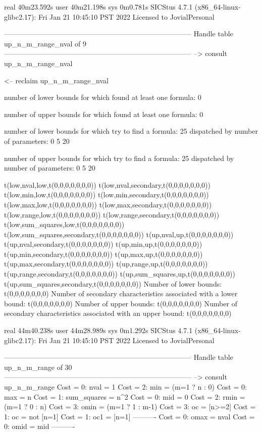 real	40m23.592s
user	40m21.198s
sys	0m0.781s
SICStus 4.7.1 (x86_64-linux-glibc2.17): Fri Jan 21 10:45:10 PST 2022
Licensed to JovialPersonal


--------------------------------------------------------------------------------
Handle table up_n_m_range_nval of 9
--------------------------------------------------------------------------------
--> consult up_n_m_range_nval

<-- reclaim up_n_m_range_nval

number of lower bounds for which found at least one formula: 0

number of upper bounds for which found at least one formula: 0

number of lower bounds for which try to find a formula: 25
dispatched by number of parameters: 0  5  20

number of upper bounds for which try to find a formula: 25
dispatched by number of parameters: 0  5  20

t(low,nval,low,t(0,0,0,0,0,0,0))
t(low,nval,secondary,t(0,0,0,0,0,0,0))
t(low,min,low,t(0,0,0,0,0,0,0))
t(low,min,secondary,t(0,0,0,0,0,0,0))
t(low,max,low,t(0,0,0,0,0,0,0))
t(low,max,secondary,t(0,0,0,0,0,0,0))
t(low,range,low,t(0,0,0,0,0,0,0))
t(low,range,secondary,t(0,0,0,0,0,0,0))
t(low,sum_squares,low,t(0,0,0,0,0,0,0))
t(low,sum_squares,secondary,t(0,0,0,0,0,0,0))
t(up,nval,up,t(0,0,0,0,0,0,0))
t(up,nval,secondary,t(0,0,0,0,0,0,0))
t(up,min,up,t(0,0,0,0,0,0,0))
t(up,min,secondary,t(0,0,0,0,0,0,0))
t(up,max,up,t(0,0,0,0,0,0,0))
t(up,max,secondary,t(0,0,0,0,0,0,0))
t(up,range,up,t(0,0,0,0,0,0,0))
t(up,range,secondary,t(0,0,0,0,0,0,0))
t(up,sum_squares,up,t(0,0,0,0,0,0,0))
t(up,sum_squares,secondary,t(0,0,0,0,0,0,0))
Number of lower bounds:                                             t(0,0,0,0,0,0,0)
Number of secondary characteristics associated with a lower bound:  t(0,0,0,0,0,0,0)
Number of upper bounds:                                             t(0,0,0,0,0,0,0)
Number of secondary characteristics associated with an upper bound: t(0,0,0,0,0,0,0)

real	44m40.238s
user	44m28.989s
sys	0m1.292s
SICStus 4.7.1 (x86_64-linux-glibc2.17): Fri Jan 21 10:45:10 PST 2022
Licensed to JovialPersonal


--------------------------------------------------------------------------------
Handle table up_n_m_range of 30
--------------------------------------------------------------------------------
--> consult up_n_m_range
Cost =  0:  nval        = 1
Cost =  2:  min         = (m=1 ? n : 0)
Cost =  0:  max         = n
Cost =  1:  sum_squares = n^2
Cost =  0:  mid         = 0
Cost =  2:  rmin        = (m=1 ? 0 : n)
Cost =  3:  omin        = (m=1 ? 1 : m-1)
Cost =  3:  oc          = [n>=2]
Cost =  1:  oc          = not [n=1]
Cost =  1:  oc1         = [n=1]
----------
Cost =  0:  omax        = nval
Cost =  0:  omid        = mid
----------

